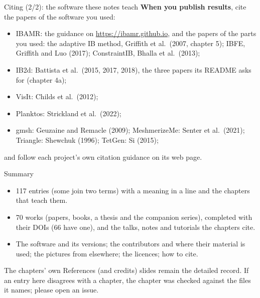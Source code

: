 \documentclass[aspectratio=169,11pt]{beamer}
\begin{document}
\begin{frame}{Citing (2/2): the software these notes teach}
\label{fr:cite2}
\small
\textbf{When you publish results}, cite the papers of the software you used:
\begin{itemize}\setlength{\itemsep}{1pt}
  \item IBAMR: the guidance on \url{https://ibamr.github.io}, and the papers of the parts you used: the adaptive IB method, Griffith et al.\ (2007, chapter 5); IBFE, Griffith and Luo (2017); ConstraintIB, Bhalla et al.\ (2013);
  \item IB2d: Battista et al.\ (2015, 2017, 2018), the three papers its README asks for (chapter 4a);
  \item VisIt: Childs et al.\ (2012);
  \item Planktos: Strickland et al.\ (2022);
  \item gmsh: Geuzaine and Remacle (2009); MeshmerizeMe: Senter et al.\ (2021); Triangle: Shewchuk (1996); TetGen: Si (2015);
\end{itemize}
and follow each project's own citation guidance on its web page.
\end{frame}

\begin{frame}{Summary}
\label{fr:summary}
\begin{itemize}
  \item 117 entries (some join two terms) with a meaning in a line and the chapters that teach them.
  \item 70 works (papers, books, a thesis and the companion series), completed with their DOIs (66 have one), and the talks, notes and tutorials the chapters cite.
  \item The software and its versions; the contributors and where their material is used; the pictures from elsewhere; the licences; how to cite.
\end{itemize}
\begin{punchbox}
\small The chapters' own References (and credits) slides remain the detailed record. If an entry here disagrees with a chapter, the chapter was checked against the files it names; please open an issue.
\end{punchbox}
\end{frame}
\end{document}
